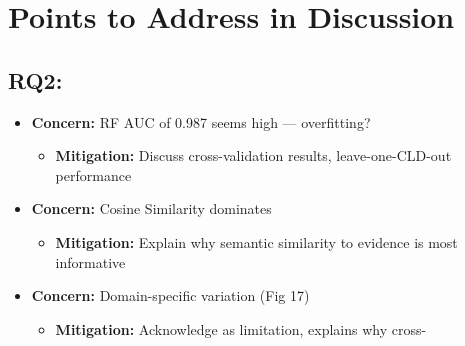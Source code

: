 \section*{Points to Address in Discussion}

\subsection*{RQ2:}

\begin{itemize}
    \item \textbf{Concern:} RF AUC of 0.987 seems high — overfitting?
    \begin{itemize}
        \item \textbf{Mitigation:} Discuss cross-validation results, leave-one-CLD-out performance
    \end{itemize}
    
    \item \textbf{Concern:} Cosine Similarity dominates
    \begin{itemize}
        \item \textbf{Mitigation:} Explain why semantic similarity to evidence is most informative
    \end{itemize}
    
    \item \textbf{Concern:} Domain-specific variation (Fig 17)
    \begin{itemize}
        \item \textbf{Mitigation:} Acknowledge as limitation, explains why cross-
    \end{itemize}
\end{itemize}

